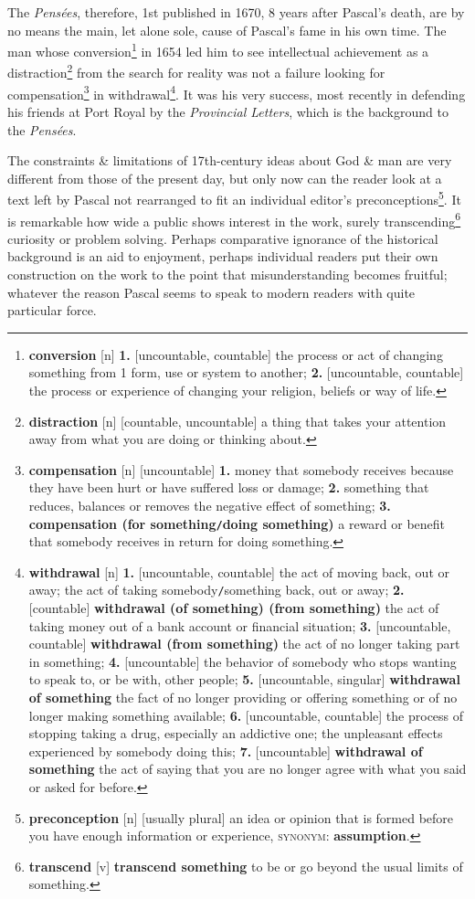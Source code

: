 \documentclass[oneside]{book}
\numberwithin{equation}{section}
\begin{document}
The \textit{Pens\'ees}, therefore, 1st published in 1670, 8 years after Pascal's death, are by no means the main, let alone sole, cause of Pascal's fame in his own time. The man whose conversion\footnote{\textbf{conversion} [n] \textbf{1.} [uncountable, countable] the process or act of changing something from 1 form, use or system to another; \textbf{2.} [uncountable, countable] the process or experience of changing your religion, beliefs or way of life.} in 1654 led him to see intellectual achievement as a distraction\footnote{\textbf{distraction} [n] [countable, uncountable] a thing that takes your attention away from what you are doing or thinking about.} from the search for reality was not a failure looking for compensation\footnote{\textbf{compensation} [n] [uncountable] \textbf{1.} money that somebody receives because they have been hurt or have suffered loss or damage; \textbf{2.} something that reduces, balances or removes the negative effect of something; \textbf{3.} \textbf{compensation (for something\texttt{/}doing something)} a reward or benefit that somebody receives in return for doing something.} in withdrawal\footnote{\textbf{withdrawal} [n] \textbf{1.} [uncountable, countable] the act of moving back, out or away; the act of taking somebody\texttt{/}something back, out or away; \textbf{2.} [countable] \textbf{withdrawal (of something) (from something)} the act of taking money out of a bank account or financial situation; \textbf{3.} [uncountable, countable] \textbf{withdrawal (from something)} the act of no longer taking part in something; \textbf{4.} [uncountable] the behavior of somebody who stops wanting to speak to, or be with, other people; \textbf{5.} [uncountable, singular] \textbf{withdrawal of something} the fact of no longer providing or offering something or of no longer making something available; \textbf{6.} [uncountable, countable] the process of stopping taking a drug, especially an addictive one; the unpleasant effects experienced by somebody doing this; \textbf{7.} [uncountable] \textbf{withdrawal of something} the act of saying that you are no longer agree with what you said or asked for before.}. It was his very success, most recently in defending his friends at Port Royal by the \textit{Provincial Letters}, which is the background to the \textit{Pens\'ees}.

The constraints \& limitations of 17th-century ideas about God \& man are very different from those of the present day, but only now can the reader look at a text left by Pascal not rearranged to fit an individual editor's preconceptions\footnote{\textbf{preconception} [n] [usually plural] an idea or opinion that is formed before you have enough information or experience, \textsc{synonym}: \textbf{assumption}.}. It is remarkable how wide a public shows interest in the work, surely transcending\footnote{\textbf{transcend} [v] \textbf{transcend something} to be or go beyond the usual limits of something.} curiosity or problem solving. Perhaps comparative ignorance of the historical background is an aid to enjoyment, perhaps individual readers put their own construction on the work to the point that misunderstanding becomes fruitful; whatever the reason Pascal seems to speak to modern readers with quite particular force.
\end{document}
